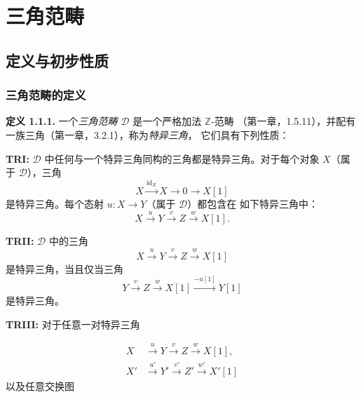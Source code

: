 \chapter{三角范畴}
%
\begingroup
\small
\setlength{\abovedisplayskip}{4pt plus 2pt minus 2pt}%
\setlength{\belowdisplayskip}{4pt plus 2pt minus 2pt}%

\section{定义与初步性质}

\subsection{三角范畴的定义}

\noindent\textbf{定义 1.1.1.}\quad
一个\emph{三角范畴} $\mathcal D$ 是一个严格加法 $\mathbb Z$-范畴
（第一章，1.5.11），并配有一族三角（第一章，3.2.1），称为\emph{特异三角}，
它们具有下列性质：

\smallskip
\noindent\textbf{TRI:}
$\mathcal D$ 中任何与一个特异三角同构的三角都是特异三角。对于每个对象
$X$（属于 $\mathcal D$），三角
\[
  X\xrightarrow{\operatorname{id}_X}X\longrightarrow 0
  \longrightarrow X[1]
\]
是特异三角。每个态射 $u\colon X\longrightarrow Y$（属于 $\mathcal D$）都包含在
如下特异三角中：
\[
  X\xrightarrow{u}Y\xrightarrow{v}Z\xrightarrow{w}X[1].
\]

\noindent\textbf{TRII:}
$\mathcal D$ 中的三角
\[
  X\xrightarrow{u}Y\xrightarrow{v}Z\xrightarrow{w}X[1]
\]
是特异三角，当且仅当三角
\[
  Y\xrightarrow{v}Z\xrightarrow{w}X[1]
  \xrightarrow{-u[1]}Y[1]
\]
是特异三角。

\noindent\textbf{TRIII:}
对于任意一对特异三角

\[
  \begin{aligned}
    X  &\xrightarrow{u}  Y  \xrightarrow{v}  Z  \xrightarrow{w}  X[1],\\
    X' &\xrightarrow{u'} Y' \xrightarrow{v'} Z' \xrightarrow{w'} X'[1]
  \end{aligned}
\]
以及任意交换图

\begin{center}
\end{center}
\endgroup
